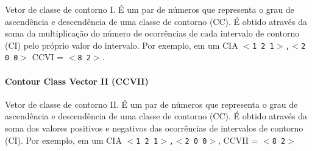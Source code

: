 \documentclass[12pt,brazil]{book}
\begin{document}
Vetor de classe de contorno I. É um par de números que representa o
grau de ascendência e descendência de uma classe de contorno (CC). É
obtido através da soma da multiplicação do número de ocorrências de
cada intervalo de contorno (CI) pelo próprio valor do intervalo. Por
exemplo, em um CIA \texttt{$<$1 2 1$>$,$<$2 0 0$>$} CCVI =
\texttt{$<$8 2$>$}.

\paragraph{Contour Class Vector II (CCVII)}
\label{sec:contour-class-vector-2}

Vetor de classe de contorno II. É um par de números que representa o
grau de ascendência e descendência de uma classe de contorno (CC). É
obtido através da soma dos valores positivos e negativos das
ocorrências de intervalos de contorno (CI). Por exemplo, em um CIA
\texttt{$<$1 2 1$>$,$<$2 0 0$>$}, CCVII = \texttt{$<$8 2$>$}
\end{document}
